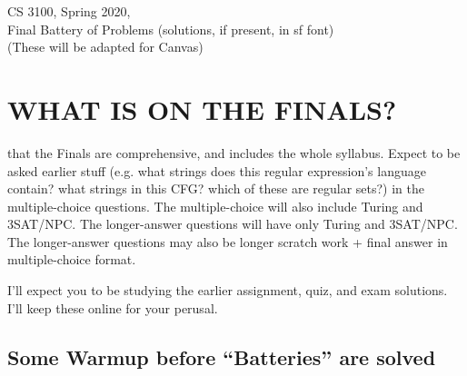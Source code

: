 \documentclass[10pt]{article}
\begin{document}



\begin{center}
\begin{large}
  CS 3100, Spring 2020, \\
  Final Battery of Problems (solutions, if present, in {\sf sf font}) \\
  (These will be adapted for Canvas)
\end{large}
\end{center}

\date{}

\vspace{1ex}

\section{WHAT IS ON THE FINALS?}

 that the Finals are comprehensive, and includes the whole syllabus.
%
Expect to be asked earlier stuff (e.g. what strings does this regular
expression's language contain? what strings in this CFG? which of these are regular sets?)
in the multiple-choice questions.
%
The multiple-choice will also include Turing and 3SAT/NPC.
%
The longer-answer questions will have only Turing and 3SAT/NPC.
%
The longer-answer questions may also be longer scratch work + final answer in multiple-choice
format.
%

I'll expect you to be studying the earlier assignment, quiz, and exam solutions.
%
I'll keep these online for your perusal.


\subsection{Some Warmup before ``Batteries'' are solved}
\end{document}
